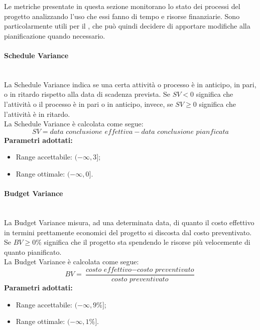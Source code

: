 Le metriche presentate in questa sezione monitorano lo stato dei processi del progetto analizzando l'uso che essi fanno di tempo e risorse finanziarie. Sono particolarmente utili per il \Res , che può quindi decidere di apportare modifiche alla pianificazione quando necessario.

\paragraph{Schedule Variance}\mbox{}\\[0,3cm]
La Schedule Variance indica se una certa attività o processo è in anticipo, in pari, o in ritardo rispetto alla data di scadenza prevista.
Se $SV < 0$ significa che l'attività o il processo è in pari o in anticipo, invece, se $SV \geq 0$ significa che l'attività è in ritardo.\\[0,2cm]
La Schedule Variance è calcolata come segue:
\[
SV = \textit{data conclusione effettiva} - \textit{data conclusione pianficata}
\]
\textbf{Parametri adottati:}
\begin{itemize}
	\item Range accettabile: $(-\infty , 3]$;
	\item Range ottimale: $(-\infty , 0]$.
\end{itemize}

\paragraph{Budget Variance}\mbox{}\\[0,3cm]
La Budget Variance misura, ad una determinata data, di quanto il costo effettivo in termini prettamente economici del progetto si discosta dal costo preventivato. Se $BV \geq 0\%$ significa che il progetto sta spendendo le risorse più velocemente di quanto pianificato.\\[0,2cm]
La Budget Variance è calcolata come segue:
\[
BV = \frac{\textit{costo effettivo} - \textit{costo preventivato}}{\textit{costo preventivato}}
\]
\textbf{Parametri adottati:}
\begin{itemize}
	\item Range accettabile: $(-\infty , 9\%]$;
	\item Range ottimale: $(-\infty , 1\%]$.
\end{itemize}